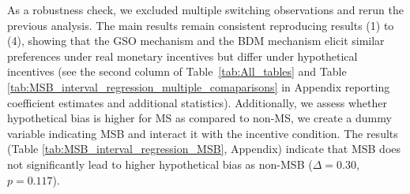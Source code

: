 \documentclass[12pt]{article}
\begin{document}
As a robustness check, we excluded multiple switching observations and rerun the previous analysis.
The main results remain consistent reproducing results (1) to (4), showing that the GSO mechanism and the BDM mechanism elicit similar preferences under real monetary incentives but differ under hypothetical incentives (see the second column of Table~\ref{tab:All_tables} and Table \ref{tab:MSB_interval_regression_multiple_comaparisons} in Appendix reporting coefficient estimates and additional statistics). 
Additionally, we assess whether hypothetical bias is higher for MS as compared to non-MS, we create a dummy variable indicating MSB and interact it with the incentive condition. The results (Table \ref{tab:MSB_interval_regression_MSB}, Appendix) indicate that MSB does not significantly lead to higher hypothetical bias as non-MSB (\(\Delta = 0.30\), \(p =0.117\)). 
\end{document}
